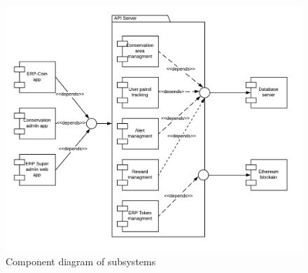 \documentclass{article}
\begin{document}
\vspace{1em}
\begin{figure}[h]
\centering

\includegraphics[scale=0.7]{ComponentDiagram.png}
\caption{Component diagram of subsystems}
\end{figure}

\newpage
\end{document}
